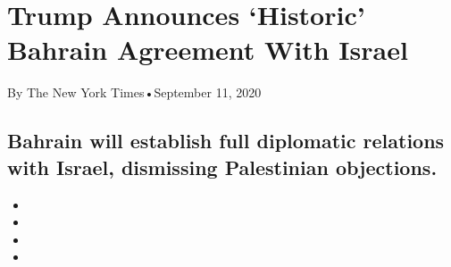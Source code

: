 \hypertarget{trump-announces-historic-bahrain-agreement-with-israel-1}{%
\section{Trump Announces `Historic' Bahrain Agreement With
Israel}\label{trump-announces-historic-bahrain-agreement-with-israel-1}}

By The New York Times•September 11, 2020

\hypertarget{bahrain-will-establish-full-diplomatic-relations-with-israel-dismissing-palestinian-objections-1}{%
\subsection{Bahrain will establish full diplomatic relations with
Israel, dismissing Palestinian
objections.}\label{bahrain-will-establish-full-diplomatic-relations-with-israel-dismissing-palestinian-objections-1}}

\begin{itemize}
\item
\item
\item
\item
\end{itemize}

